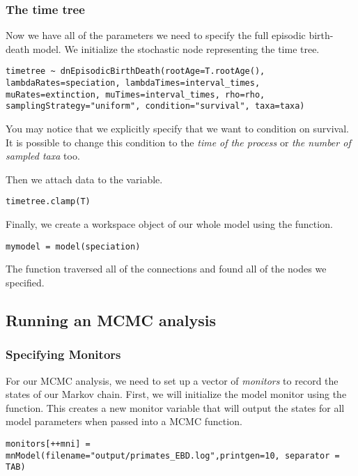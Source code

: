 \subsubsection{The time tree}

Now we have all of the parameters we need to specify the full episodic birth-death model.
We initialize the stochastic node representing the time tree.
{\tt \begin{snugshade*}
\begin{lstlisting}
timetree ~ dnEpisodicBirthDeath(rootAge=T.rootAge(), lambdaRates=speciation, lambdaTimes=interval_times, muRates=extinction, muTimes=interval_times, rho=rho, samplingStrategy="uniform", condition="survival", taxa=taxa)
\end{lstlisting}
\end{snugshade*}}
You may notice that we explicitly specify that we want to condition on survival.
It is possible to change this condition to the \emph{time of the process} or \emph{the number of sampled taxa} too.

Then we attach data to the  variable.
{\tt \begin{snugshade*}
\begin{lstlisting}
timetree.clamp(T)
\end{lstlisting}
\end{snugshade*}}

Finally, we create a workspace object of our whole model using the  function.
{\tt \begin{snugshade*}
\begin{lstlisting}
mymodel = model(speciation)
\end{lstlisting}
\end{snugshade*}}

The  function traversed all of the connections and found all of the nodes we specified.


\subsection{Running an MCMC analysis}

\subsubsection{Specifying Monitors}

For our MCMC analysis, we need to set up a vector of \textit{monitors} to record the states of our Markov chain.
First, we will initialize the model monitor using the  function. This creates a new monitor variable that will output the states for all model parameters when passed into a MCMC function.
{\tt \begin{snugshade*}
\begin{lstlisting}
monitors[++mni] = mnModel(filename="output/primates_EBD.log",printgen=10, separator = TAB)
\end{lstlisting}
\end{snugshade*}}

